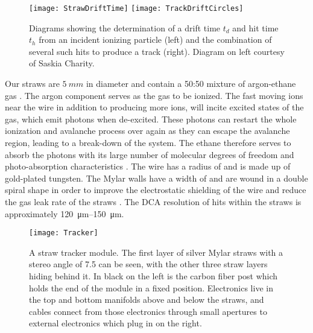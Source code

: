 \begin{figure}
\centering
        \texttt{[image: StrawDriftTime]}
    \hspace{1cm}
        \texttt{[image: TrackDriftCircles]}
\caption[Straw tracker drift circles]{Diagrams showing the determination of a drift time $t_{d}$ and hit time $t_{h}$ from an incident ionizing particle (left) and the combination of several such hits to produce a track (right). Diagram on left courtesy of Saskia Charity.}
\label{fig:driftcircles}
\end{figure}




Our straws are $\SI{5}{mm}$ in diameter and contain a 50:50 mixture of argon-ethane gas \cite{WTThesis}. The argon component serves as the gas to be ionized. The fast moving ions near the wire in addition to producing more ions, will incite excited states of the gas, which emit photons when de-excited. These photons can restart the whole ionization and avalanche process over again as they can escape the avalanche region, leading to a break-down of the system. The ethane therefore serves to absorb the photons with its large number of molecular degrees of freedom and photo-absorption characteristics \cite{WTThesis}. The wire has a radius of  and is made up of gold-plated tungsten. The Mylar walls have a width of  and are wound in a double spiral shape in order to improve the electrostatic shielding of the wire and reduce the gas leak rate of the straws \cite{WTThesis}. The DCA resolution of hits within the straws is approximately \SIrange{120}{150}{\micro m}.


\begin{figure}
    \centering
    \texttt{[image: Tracker]}
    \caption[Tracker module]{A straw tracker module. The first layer of silver Mylar straws with a stereo angle of 7.5\textdegree{} can be seen, with the other three straw layers hiding behind it. In black on the left is the carbon fiber post which holds the end of the module in a fixed position. Electronics live in the top and bottom manifolds above and below the straws, and cables connect from those electronics through small apertures to external electronics which plug in on the right.}
    \label{fig:tracker}
\end{figure}




